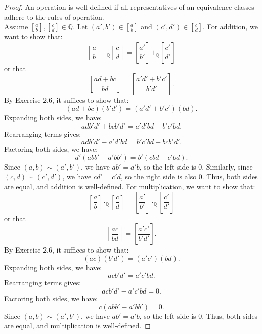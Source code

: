 \documentclass[11pt]{article}
\begin{document}
\begin{proof}
An operation is well-defined if all representatives of an equivalence classes adhere to the rules of operation. \\
Assume $\left[\frac{a}{b}\right], \left[\frac{c}{d}\right] \in \mathbb{Q}$. Let $(a',b') \in \left[\frac{a}{b}\right]$ and $(c',d') \in \left[\frac{c}{d}\right]$. For addition, we want to show that:
\[\left[\frac{a}{b}\right] +_\mathbb{Q} \left[\frac{c}{d}\right] = \left[\frac{a'}{b'}\right] +_\mathbb{Q} \left[\frac{c'}{d'}\right]\]
or that
\[\left[\frac{ad + bc}{bd}\right] = \left[\frac{a'd' + b'c'}{b'd'}\right].\]
By Exercise 2.6, it suffices to show that:
\[(ad + bc)(b'd') = (a'd' + b'c')(bd).\]
Expanding both sides, we have:
\[ad b'd' + bc b'd' = a' d' bd + b' c' bd.\]
Rearranging terms gives:
\[ad b'd' - a' d' bd = b' c' bd - bc b'd'.\]
Factoring both sides, we have:
\[d' (ab b' - a' b b') = b' (c bd - c' b d).\]
Since $(a,b) \sim (a',b')$, we have $ab' = a'b$, so the left side is 0. Similarly, since $(c,d) \sim (c',d')$, we have $cd' = c'd$, so the right side is also 0. Thus, both sides are equal, and addition is well-defined.
For multiplication, we want to show that:
\[\left[\frac{a}{b}\right] \cdot_\mathbb{Q} \left[\frac{c}{d}\right] = \left[\frac{a'}{b'}\right] \cdot_\mathbb{Q} \left[\frac{c'}{d'}\right]\]
or that
\[\left[\frac{ac}{bd}\right] = \left[\frac{a'c'}{b'd'}\right].\]
By Exercise 2.6, it suffices to show that:
\[(ac)(b'd') = (a'c')(bd).\]
Expanding both sides, we have:
\[ac b'd' = a' c' bd.\]
Rearranging terms gives:
\[ac b'd' - a' c' bd = 0.\]
Factoring both sides, we have:
\[c (ab b' - a' b b') = 0.\]
Since $(a,b) \sim (a',b')$, we have $ab' = a'b$, so the left side is 0. Thus, both sides are equal, and multiplication is well-defined.
\end{proof}
\end{document}
